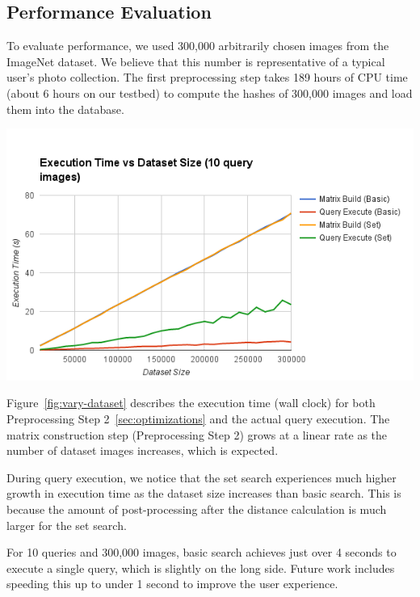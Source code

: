 \subsection{Performance Evaluation}
To evaluate performance, we used 300,000 arbitrarily chosen images from the ImageNet dataset.
We believe that this number is representative of a typical user's photo collection.
The first preprocessing step takes 189 hours of CPU time (about 6 hours on our testbed) to compute the hashes of 300,000 images and load them into the database.

\begin{minipage}{1.0\columnwidth}
    \centering
    \includegraphics[width=0.9\columnwidth]{figs/vary-dataset}
    \label{fig:vary-dataset}
\end{minipage}
Figure~\ref{fig:vary-dataset} describes the execution time (wall clock) for both Preprocessing Step 2~\ref{sec:optimizations} and the actual query execution.
The matrix construction step (Preprocessing Step 2) grows at a linear rate as the number of dataset images increases, which is expected.

During query execution, we notice that the set search experiences much higher growth in execution time as the dataset size increases than basic search.
This is because the amount of post-processing after the distance calculation is much larger for the set search.

For 10 queries and 300,000 images, basic search achieves just over 4 seconds to execute a single query, which is slightly on the long side. Future work includes
speeding this up to under 1 second to improve the user experience.

